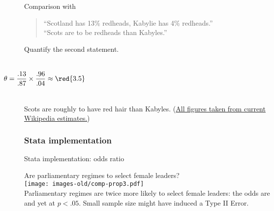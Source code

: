 \documentclass[t]{beamer}
\begin{document}
	\begin{frame}[t]{Comparison with }
					
		\begin{quote}
		``Scotland has 13\% redheads, Kabylie has 4\% redheads.''\\
		``Scots are  to be redheads than Kabyles.''
		\end{quote}
		
		Quantify the second statement.
		
		\begin{columns}[t]
		\vspace{-.5em}
		
	\vspace{3.275em}	
	$$\hspace{-3em}\theta = \frac{.13}{.87}\times\frac{.96}{.04}\approx\red{3.5}$$
	\end{columns}
	
	\vspace{1.5em}
	Scots are roughly  to have red hair than Kabyles. (\href{http://en.wikipedia.org/wiki/Red_hair}{All figures taken from current Wikipedia estimates.})
		
	\end{frame}	

	\subsubsection{Stata implementation}

	\begin{frame}[t]{Stata implementation: odds ratio}

	Are parliamentary regimes  to select female leaders?\\[1em]
	
	\texttt{[image: images-old/comp-prop3.pdf]}\\[1em]
	
	Parliamentary regimes are twice more likely to select female leaders: the odds are  and yet  at $p < .05$. Small sample size might have induced a Type II Error.
	\end{frame}
	

	
\end{document}
